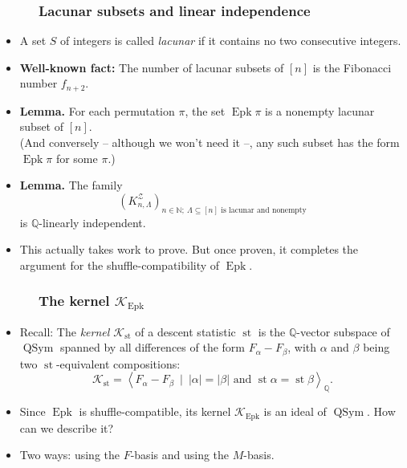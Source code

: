 \documentclass{beamer}
\newcommand{\QQ}{{\mathbb Q}}
\newcommand{\Epk}{\operatorname{Epk}}
\newcommand{\st}{\operatorname{st}}
\newcommand{\QSym}{\operatorname{QSym}}
\newcommand{\calK}{\mathcal{K}}
\newcommand{\fti}[1]{\frametitle{\ \ \ \ \ #1}}
\newcommand{\abs}[1]{\left| #1 \right|}
\newcommand{\ive}[1]{\left[ #1 \right]}
\newcommand{\defn}[1]{{\color{darkred}\emph{#1}}} %
\theoremstyle{plain}
\begin{document}
\begin{frame}
\fti{Lacunar subsets and linear independence}

\begin{itemize}

\item A set $S$ of integers is called \defn{lacunar} if it contains
      no two consecutive integers.

\item \textbf{Well-known fact:} The number of lacunar subsets of
      $\ive{n}$ is the Fibonacci number $f_{n+2}$.

\pause

\item \textbf{Lemma.}
      For each permutation $\pi$, the set $\Epk \pi$ is a nonempty
      lacunar subset of $\ive{n}$. \\
      (And conversely -- although we won't need it --,
      any such subset has the form $\Epk \pi$ for some $\pi$.)

\pause

\item \textbf{Lemma.}
      The family%
\[
\left(  K_{n,\Lambda}^{\mathcal{Z}}\right)  _{n\in\mathbb{N};\ \Lambda
\subseteq\left[  n\right]  \text{ is lacunar and nonempty}}%
\]
is $\mathbb{Q}$-linearly independent.

\item This actually takes work to prove. But once proven, it completes
      the argument for the shuffle-compatibility of $\Epk$.

\end{itemize}

\end{frame}


\begin{frame}
\fti{The kernel $\calK_{\Epk}$}

\begin{itemize}

\item Recall: The \defn{kernel $\calK_{\st}$} of a descent statistic $\st$
      is the $\QQ$-vector subspace of $\QSym$ spanned by all
      differences of the form $F_\alpha - F_\beta$, with $\alpha$
      and $\beta$ being two $\st$-equivalent compositions:
      \[
      \calK_{\st} = \left< F_\alpha - F_\beta \ 
                              \mid \ \abs{\alpha} = \abs{\beta} \text{ and }
                                   \st \alpha = \st \beta \right>_\QQ .
      \]

\pause

\item Since $\Epk$ is shuffle-compatible, its kernel $\calK_{\Epk}$
      is an ideal of $\QSym$.
      How can we describe it?

\item Two ways: using the $F$-basis and using the $M$-basis.

\end{itemize}

\end{frame}
\end{document}
